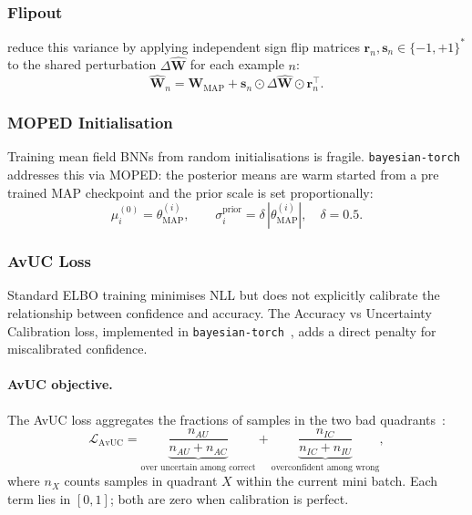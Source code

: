 \documentclass[conference]{IEEEtran}
\newcommand{\MAP}{\text{MAP}}
\begin{document}
\subsubsection{Flipout}

\citet{wen2018flipout} reduce this variance by applying independent sign flip
matrices $\mathbf{r}_n,\mathbf{s}_n\in\{-1,+1\}^*$ to the shared
perturbation $\Delta\hat{\mathbf{W}}$ for each example $n$:
\begin{equation}
	\hat{\mathbf{W}}_n
	= \mathbf{W}_{\MAP} + \mathbf{s}_n \odot \Delta\hat{\mathbf{W}}
	\odot \mathbf{r}_n^{\!\top}.
\end{equation}

\subsubsection{MOPED Initialisation}

Training mean field BNNs from random initialisations is fragile.
\texttt{bayesian-torch}~\citep{intel2021bayesiantorch} addresses this via
MOPED: the posterior means are warm started from a
pre trained MAP checkpoint and the prior scale is set proportionally:
\begin{equation}
	\mu_i^{(0)} = \theta_{\MAP}^{(i)}, \qquad
	\sigma_i^{\text{prior}} = \delta\,|\theta_{\MAP}^{(i)}|, \quad \delta=0.5.
\end{equation}

\subsubsection{AvUC Loss}
\label{sec:theory:avuc}

Standard ELBO training minimises NLL but does not explicitly calibrate the
relationship between confidence and accuracy.
The
Accuracy vs Uncertainty Calibration loss, implemented in
\texttt{bayesian-torch}~\citep{intel2021bayesiantorch}, adds a direct
penalty for miscalibrated confidence.

\paragraph{AvUC objective.}
The AvUC loss aggregates the fractions of samples in the two
bad quadrants~\citep{intel2021bayesiantorch}:
\begin{equation}
	\mathcal{L}_{\mathrm{AvUC}}
	= \underbrace{\frac{n_{AU}}{n_{AU}+n_{AC}}}_{\text{over uncertain among correct}}
	+ \underbrace{\frac{n_{IC}}{n_{IC}+n_{IU}}}_{\text{overconfident among wrong}},
	\label{eq:avuc}
\end{equation}
where $n_X$ counts samples in quadrant $X$ within the current mini batch.
Each term lies in $[0,1]$; both are zero when calibration is perfect.
\end{document}

